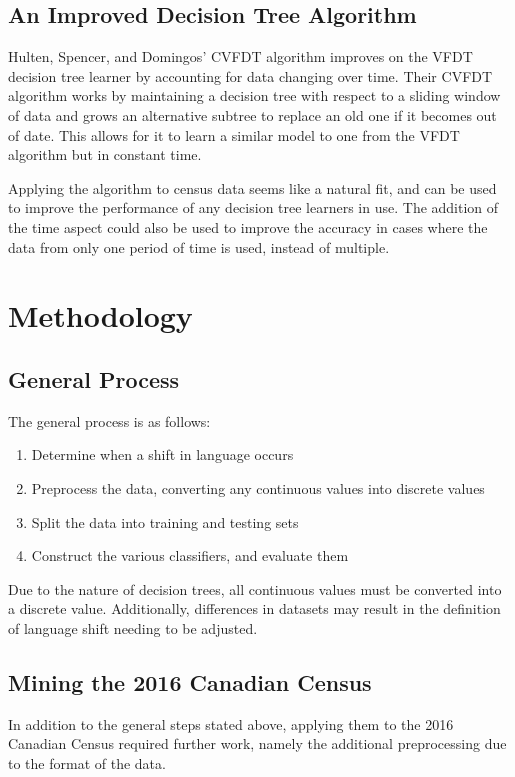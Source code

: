 \documentclass[10pt, conference, compsocconf]{IEEEtran}
\begin{document}
\subsection{An Improved Decision Tree Algorithm}
Hulten, Spencer, and Domingos' CVFDT algorithm improves on the VFDT decision tree learner by accounting for data changing over time. \cite{dtrees1} Their CVFDT algorithm works by maintaining a decision tree with respect to a sliding window of data and grows an alternative subtree to replace an old one if it becomes out of date. This allows for it to learn a similar model to one from the VFDT algorithm but in constant time. \cite{dtrees1}

Applying the algorithm to census data seems like a natural fit, and can be used to improve the performance of any decision tree learners in use. The addition of the time aspect could also be used to improve the accuracy in cases where the data from only one period of time is used, instead of multiple.


\section{Methodology}

\subsection{General Process}
The general process is as follows:
\begin{enumerate}
	\item Determine when a shift in language occurs
	\item Preprocess the data, converting any continuous values into discrete values
	\item Split the data into training and testing sets
	\item Construct the various classifiers, and evaluate them
\end{enumerate}

Due to the nature of decision trees, all continuous values must be converted into a discrete value. Additionally, differences in datasets may result in the definition of language shift needing to be adjusted.

\subsection{Mining the 2016 Canadian Census}
In addition to the general steps stated above, applying them to the 2016 Canadian Census required further work, namely the additional preprocessing due to the format of the data.
\end{document}
